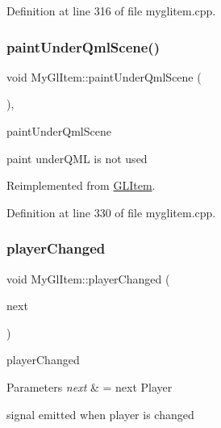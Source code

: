 Definition at line 316 of file myglitem.\+cpp.

\mbox{\label{class_my_gl_item_a46ffc33e9892262f9d1d88c14fa0e092}} 
\subsubsection{\texorpdfstring{paintUnderQmlScene()}{paintUnderQmlScene()}}
{\footnotesize\ttfamily void My\+Gl\+Item\+::paint\+Under\+Qml\+Scene (\begin{DoxyParamCaption}{ }\end{DoxyParamCaption})\hspace{0.3cm}{\ttfamily [override]}, {\ttfamily [virtual]}}



paint\+Under\+Qml\+Scene 

paint under\+Q\+ML is not used 

Reimplemented from \mbox{\hyperlink{class_g_l_item_a6e779fa84599e999b6e299d5aac92fa2}{G\+L\+Item}}.



Definition at line 330 of file myglitem.\+cpp.

\mbox{\label{class_my_gl_item_a93137c1e883f74e699e3dd164cd1cd43}} 
\subsubsection{\texorpdfstring{playerChanged}{playerChanged}}
{\footnotesize\ttfamily void My\+Gl\+Item\+::player\+Changed (\begin{DoxyParamCaption}\item[{Q\+String}]{next }\end{DoxyParamCaption})\hspace{0.3cm}{\ttfamily [signal]}}



player\+Changed 


\begin{DoxyParams}{Parameters}
{\em next} & = next Player\\
\hline
\end{DoxyParams}
signal emitted when player is changed \mbox{\label{class_my_gl_item_a5b6e041f52d5d97782584b099596b5f5}} 
